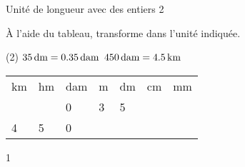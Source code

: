 \documentclass[a4paper,11pt]{report}
\begin{document}
\begin{resolu}{Unité de longueur avec des entiers 2}
{À l'aide du tableau, transforme dans l'unité indiquée.

\begin{tasks}(2)
    \task $\tunit{35}{\deci m}= \tunit{0,35}{\deca  m}$
    \task $\tunit{450}{\deca m} = \tunit{4,5}{\kilo m}$
    
\end{tasks}
\begin{center}


\begin{tabular}{*{7}{|x{1.5cm}}|}
 \hline
   km & hm & dam &m &dm &cm&mm\\   
 &   & 0& 3&5 & & \\ 
 \hline

4 & 5  & 0& & & & \\
\hline

\end{tabular}
\end{center}}
{1}
\end{resolu}
\end{document}
